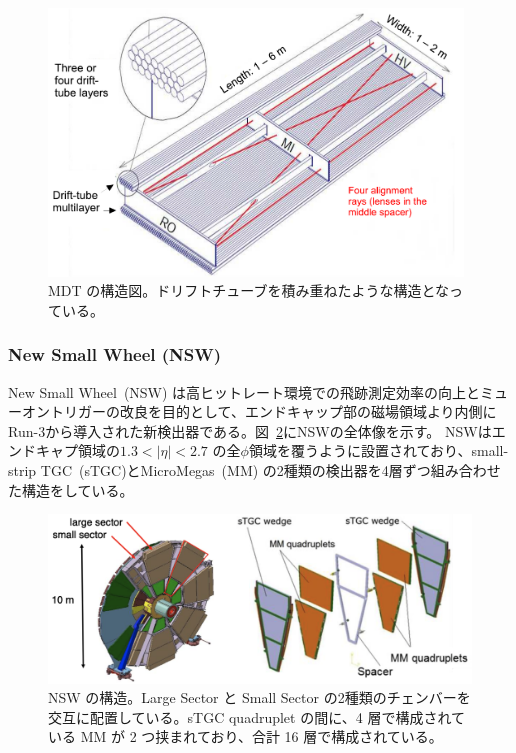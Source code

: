 \begin{figure}[tb]
  \centering
  \includegraphics[clip, width=11cm]{fig/2/MDT_chamber_schematics_2.pdf}
  \caption{MDT の構造図\cite{Aad:1129811}。ドリフトチューブを積み重ねたような構造となっている。}
  \label{fig:MDT}
\end{figure}


\subsubsection{New Small Wheel (NSW)}
New Small Wheel~(NSW) は高ヒットレート環境での飛跡測定効率の向上とミューオントリガーの改良を目的として、エンドキャップ部の磁場領域より内側にRun-3から導入された新検出器である\cite{article:NSW_tech}。図~\ref{fig:NSW}にNSWの全体像を示す。
NSWはエンドキャプ領域の$1.3 < |\eta| < 2.7$ の全$\phi$領域を覆うように設置されており、small-strip TGC~(sTGC)とMicroMegas~(MM) の2種類の検出器を4層ずつ組み合わせた構造をしている。
\begin{figure}[tb]
  \centering
  \includegraphics[clip, width=13cm]{fig/2/nsw-structure.png}
  \caption{NSW の構造\cite{article:NSW}。Large Sector と Small Sector の2種類のチェンバーを交互に配置している。sTGC quadruplet の間に、4 層で構成されている MM が 2 つ挟まれており、合計 16 層で構成されている。}
  \label{fig:NSW}
\end{figure}

